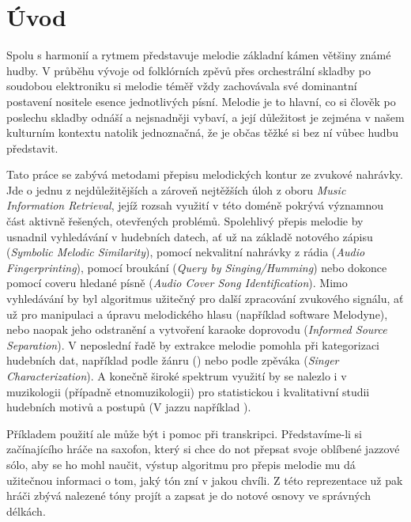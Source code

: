 \chapter*{Úvod}

Spolu s harmonií a rytmem představuje melodie základní kámen většiny známé hudby. V průběhu vývoje od folklórních zpěvů přes orchestrální skladby po soudobou elektroniku si melodie téměř vždy zachovávala své dominantní postavení nositele esence jednotlivých písní. Melodie je to hlavní, co si člověk po poslechu skladby odnáší a nejsnadněji vybaví, a její důležitost je zejména v našem kulturním kontextu natolik jednoznačná, že je občas těžké si bez ní vůbec hudbu představit. 

Tato práce se zabývá metodami přepisu melodických kontur ze zvukové nahrávky. Jde o jednu z nejdůležitějších a zároveň nejtěžších úloh z oboru \textit{Music Information Retrieval}, jejíž rozsah využití v této doméně pokrývá významnou část aktivně řešených, otevřených problémů. Spolehlivý přepis melodie by usnadnil vyhledávání v hudebních datech, ať už na základě notového zápisu (\textit{Symbolic Melodic Similarity}), pomocí nekvalitní nahrávky z rádia (\textit{Audio Fingerprinting}), pomocí broukání (\textit{Query by Singing/Humming}) nebo dokonce pomocí coveru hledané písně (\textit{Audio Cover Song Identification}). Mimo vyhledávání by byl algoritmus užitečný pro další zpracování zvukového signálu, ať už pro manipulaci a úpravu melodického hlasu (například software Melodyne), nebo naopak jeho odstranění a vytvoření karaoke doprovodu (\textit{Informed Source Separation}). V neposlední řadě by extrakce melodie pomohla při kategorizaci hudebních dat, například podle žánru (\cite{Salamon2012}) nebo podle zpěváka (\textit{Singer Characterization}). A konečně široké spektrum využití by se nalezlo i v muzikologii (případně etnomuzikologii) pro statistickou i kvalitativní studii hudebních motivů a postupů (V jazzu například \cite{Pfleiderer}).

Příkladem použití ale může být i pomoc při transkripci. Představíme-li si začínajícího hráče na saxofon, který si chce do not přepsat svoje oblíbené jazzové sólo, aby se ho mohl naučit, výstup algoritmu pro přepis melodie mu dá užitečnou informaci o tom, jaký tón zní v jakou chvíli. Z této reprezentace už pak hráči zbývá nalezené tóny projít a zapsat je do notové osnovy ve správných délkách.